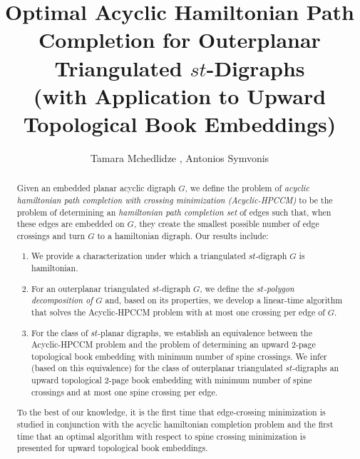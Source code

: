 \documentclass{myllncs-mixalis}
\begin{document}
\parindent=0cm
\parskip=5pt


\title{Optimal Acyclic Hamiltonian Path Completion for Outerplanar Triangulated
$st$-Digraphs\\
(with Application to Upward Topological Book Embeddings)}
\author{
Tamara  Mchedlidze ,  Antonios Symvonis }


\maketitle

\vspace{-10pt}

\begin{abstract}

Given an embedded  planar acyclic digraph $G$, we define the problem
of \emph{acyclic hamiltonian path completion with crossing
minimization (Acyclic-HPCCM)} to be the problem of determining an
\emph{hamiltonian path completion set} of edges such that, when
these edges are embedded on $G$, they create the smallest possible
number of edge crossings and turn  $G$ to a hamiltonian digraph. Our
results include:
\begin{enumerate}
\item
We provide a characterization under which a triangulated
$st$-digraph $G$ is hamiltonian.
\item For an outerplanar triangulated $st$-digraph $G$,
we define the \emph{$st$-polygon decomposition of $G$} and, based on
its properties, we develop a linear-time algorithm that solves the
Acyclic-HPCCM problem with at most one crossing per edge of $G$.
\item
For the class of $st$-planar digraphs, we establish an equivalence
between the Acyclic-HPCCM problem and the problem of determining an
upward 2-page topological book embedding with  minimum number of
spine crossings. We infer (based on this equivalence) for the class
of outerplanar triangulated $st$-digraphs an upward topological
2-page book embedding with minimum number of spine crossings and at
most one spine crossing per edge.
\end{enumerate}

To the best of our knowledge, it is the first time  that
edge-crossing minimization is studied in conjunction with the
acyclic hamiltonian completion problem and the first time that an
optimal algorithm with respect to spine crossing minimization is
presented for upward topological book embeddings.
\end{abstract}
\end{document}
